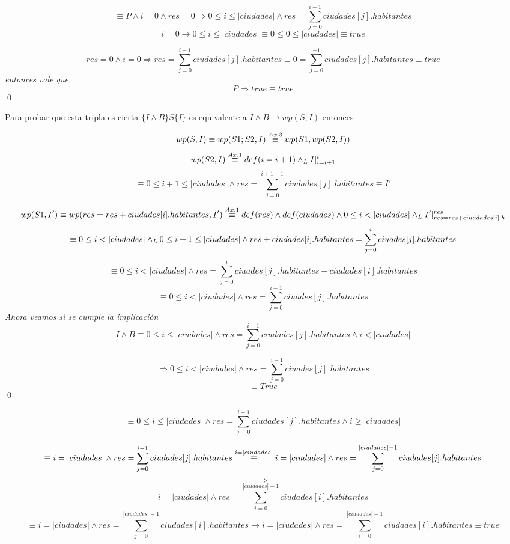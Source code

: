\documentclass[10pt,a4paper]{article}
\begin{document}
\begin{demoPc}
		\begin{demo1}
			\[ 
			\equiv P \land i=0\land res=0 \Longrightarrow 0 \leq i \leq |ciudades| \land res=\sum_{j=0}^{i-1}ciudades[j].habitantes
			\]
			\[i=0 \to 0 \leq i \leq |ciudades| \equiv 0 \leq 0 \leq |ciudades| \equiv true\]
			
			\[res=0 \land i=0\Longrightarrow res= \sum_{j=0}^{i-1} ciudades[j].habitantes \equiv 0 = \sum_{j=0}^{-1} ciudades[j].habitantes \equiv true \]
			\textit{entonces vale que}
			\[P \Longrightarrow true \equiv true \]
			\qed \\
			
		\end{demo1}
		
		
		\begin{demo2}
			Para probar que esta tripla es cierta $\{I \land B\}S\{I\}$  es equivalente a $I \land B \to wp(S,I)$ entonces\par
			\[
			wp(S,I) \equiv wp(S1;S2,I) \overset{\scriptsize Ax. 3}{\equiv}wp(S1,wp(S2,I))
			\]
			\[ 	wp(S2,I) \overset{\scriptsize Ax. 1}{\equiv} def(i=i+1) \land _L I|_{i=i+1}^{i}
			\]	
			\[ \equiv 0\leq i+1 \leq |ciudades| \land res=\sum_{j=0}^{i+1-1} ciudades[j].habitantes  \equiv I' \]\par
			
			\[wp(S1,I') \equiv wp(res=res+ciudades[i].habitantes,I')\overset{\scriptsize Ax. 1}{\equiv} def(res) \land def(ciudades) \land 0 \leq i < |ciudades| \land _L I'|_{res=res+ciuadades[i].h}^{res}\]
			\[
			\equiv 0 \leq i <|ciudades| \yLuego 0\leq i+1 \leq |ciudades|\land res+ ciudades[i].habitantes=\sum_{j=0}^{i} ciuades[j].habitantes
			\]
			\[\equiv 0 \leq i < |ciudades| \land res=\sum_{j=0}^{i} ciuades[j].habitantes -ciudades[i].habitantes \]
			\[
			\boxed{	\equiv 0 \leq i < |ciudades| \land res=\sum_{j=0}^{i-1} ciuades[j].habitantes }
			\]
			\textit{Ahora veamos si se cumple la implicación}
			\[
			I \land B \equiv 0 \leq i \leq |ciudades| \land res= \sum_{j=0}^{i-1} ciudades[j].habitantes \land  i < \lvert ciudades \rvert 
			\]
			
			\[ \Longrightarrow 0 \leq i < |ciudades| \land res=\sum_{j=0}^{i-1} ciuades[j].habitantes \]
			\[\equiv True\]
			\qed 
			
		\end{demo2}
		\begin{demo3}
			\[
			\equiv 0 \leq i \leq \lvert ciudades\rvert \land  res=  \sum_{j=0}^{i-1} ciudades[j].habitantes \land i \geq |ciudades| 
			\]
			
			\[\equiv i=|ciudades| \land  res=\sum_{j=0}^{i-1} ciudades[j].habitantes \overset{{\tiny i= |ciudades|}}{\equiv} i=|ciudades| \land  res=\sum_{j=0}^{|ciudades|-1} ciudades[j].habitantes
			\]
			\[\Longrightarrow\]
			\[i = |ciudades| \land res=\sum_{i=0}^{|ciudades|-1} ciudades[i].habitantes
			\]
			\[\equiv i = |ciudades| \land res=\sum_{j=0}^{|ciudades|-1} ciudades[i].habitantes \to i = |ciudades| \land res=\sum_{i=0}^{|ciudades|-1} ciudades[i].habitantes \equiv true\]
			

\end{demo3}
\end{demoPc}
\end{document}
